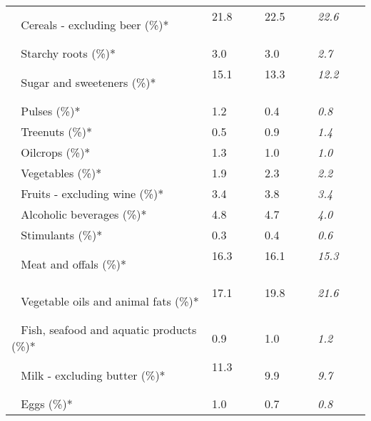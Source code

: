 \begin{tabular}{L{3.9cm} R{1cm} R{1cm} R{1cm}}
	 ~ Cereals - excluding beer (\%)* & 21.8 ~ \ \ & 22.5 ~ \ \ & \textit{22.6} ~ \ \ \\ 
	 ~ Starchy roots (\%)* & 3.0 ~ \ \ & 3.0 ~ \ \ & \textit{2.7} ~ \ \ \\ 
	 ~ Sugar and sweeteners (\%)* & 15.1 ~ \ \ & 13.3 ~ \ \ & \textit{12.2} ~ \ \ \\ 
	 ~ Pulses (\%)* & 1.2 ~ \ \ & 0.4 ~ \ \ & \textit{0.8} ~ \ \ \\ 
	 ~ Treenuts (\%)* & 0.5 ~ \ \ & 0.9 ~ \ \ & \textit{1.4} ~ \ \ \\ 
	 ~ Oilcrops (\%)* & 1.3 ~ \ \ & 1.0 ~ \ \ & \textit{1.0} ~ \ \ \\ 
	 ~ Vegetables (\%)* & 1.9 ~ \ \ & 2.3 ~ \ \ & \textit{2.2} ~ \ \ \\ 
	 ~ Fruits - excluding wine (\%)* & 3.4 ~ \ \ & 3.8 ~ \ \ & \textit{3.4} ~ \ \ \\ 
	 ~ Alcoholic beverages (\%)* & 4.8 ~ \ \ & 4.7 ~ \ \ & \textit{4.0} ~ \ \ \\ 
	 ~ Stimulants (\%)* & 0.3 ~ \ \ & 0.4 ~ \ \ & \textit{0.6} ~ \ \ \\ 
	 ~ Meat and offals (\%)* & 16.3 ~ \ \ & 16.1 ~ \ \ & \textit{15.3} ~ \ \ \\ 
	 ~ Vegetable oils and animal fats (\%)* & 17.1 ~ \ \ & 19.8 ~ \ \ & \textit{21.6} ~ \ \ \\ 
	 ~ Fish, seafood and aquatic products (\%)* & 0.9 ~ \ \ & 1.0 ~ \ \ & \textit{1.2} ~ \ \ \\ 
	 ~ Milk - excluding butter (\%)* & 11.3 ~ \ \ & 9.9 ~ \ \ & \textit{9.7} ~ \ \ \\ 
	 ~ Eggs (\%)* & 1.0 ~ \ \ & 0.7 ~ \ \ & \textit{0.8} ~ \ \ \\ 
       \toprule
      \end{tabular}
      \clearpage
{}
